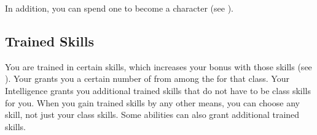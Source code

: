     In addition, you can spend one  to become a  character (see ).

  \subsection{Trained Skills}\label{Trained Skills}
    You are trained in certain skills, which increases your bonus with those skills (see ).
    Your  grants you a certain number of  from among the  for that class.
    Your Intelligence grants you additional trained skills that do not have to be class skills for you.
    When you gain trained skills by any other means, you can choose any skill, not just your class skills.
    Some abilities can also grant additional trained skills.
